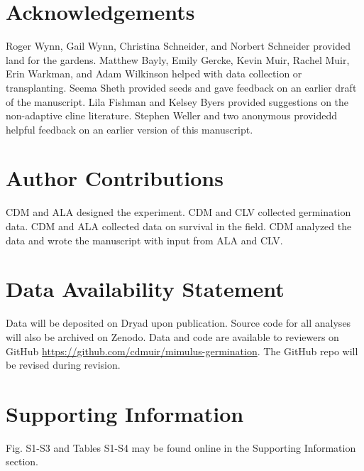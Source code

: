 \documentclass[
  12pt,
]{article}
\begin{document}
\hypertarget{acknowledgements}{%
\section{Acknowledgements}\label{acknowledgements}}

Roger Wynn, Gail Wynn, Christina Schneider, and Norbert Schneider provided land for the gardens. Matthew Bayly, Emily Gercke, Kevin Muir, Rachel Muir, Erin Warkman, and Adam Wilkinson helped with data collection or transplanting. Seema Sheth provided seeds and gave feedback on an earlier draft of the manuscript. Lila Fishman and Kelsey Byers provided suggestions on the non-adaptive cline literature. Stephen Weller and two anonymous providedd helpful feedback on an earlier version of this manuscript.

\hypertarget{author-contributions}{%
\section{Author Contributions}\label{author-contributions}}

CDM and ALA designed the experiment. CDM and CLV collected germination data. CDM and ALA collected data on survival in the field. CDM analyzed the data and wrote the manuscript with input from ALA and CLV.

\hypertarget{data-availability-statement}{%
\section{Data Availability Statement}\label{data-availability-statement}}

Data will be deposited on Dryad upon publication. Source code for all analyses will also be archived on Zenodo. Data and code are available to reviewers on GitHub \url{https://github.com/cdmuir/mimulus-germination}. The GitHub repo will be revised during revision.

\hypertarget{supporting-information}{%
\section{Supporting Information}\label{supporting-information}}

Fig. S1-S3 and Tables S1-S4 may be found online in the Supporting Information section.

\renewcommand\thefigure{S\arabic{figure}}    
\renewcommand\thetable{S\arabic{table}}    
\setcounter{figure}{0}    
\setcounter{table}{0}
\end{document}
